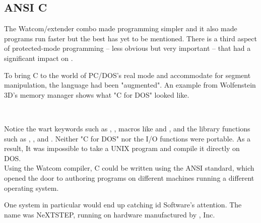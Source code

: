 \subsection{ANSI C}
The Watcom/extender combo made programming simpler and it also made programs run faster but the best has yet to be mentioned. There is a third aspect of protected-mode programming -- less obvious but very important -- that had a significant impact on \doom.\\
\par
To bring C to the world of PC/DOS's real mode and accommodate for segment manipulation, the language had been "augmented". An example from Wolfenstein 3D's memory manager shows what "C for DOS" looked like.\\
\par
{}\\
\par
Notice the wart keywords such as , , macros like  and , and the  library functions such as , , and . Neither "C for DOS" nor the I/O functions were portable. As a result, It was impossible to take a UNIX program and compile it directly on DOS.\\
Using the Watcom compiler, C could be written using the ANSI standard, which opened the door to authoring programs on different machines running a different operating system.\\
\par
One system in particular would end up catching id Software's attention. The name was NeXTSTEP, running on hardware manufactured by \NeXTns, Inc.
